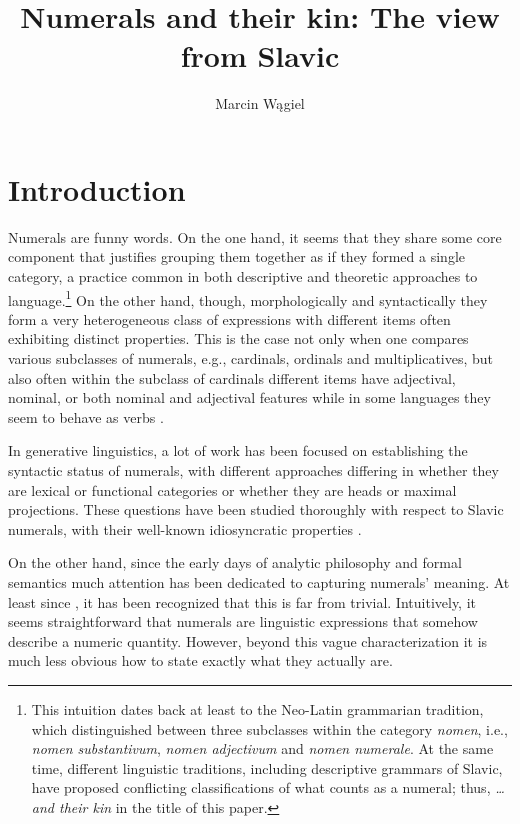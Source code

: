 \documentclass[output=paper]{langscibook}
\author{Marcin Wągiel\affiliation{Masaryk University in Brno, University of Wrocław, Leibniz-ZAS in Berlin}}
\title{Numerals and their kin: The view from Slavic}
\begin{document}
	\maketitle
	
	\section{Introduction}	Numerals are funny words. On the one hand, it seems that they share some core component that justifies grouping them together as if they formed a single category, a practice common in both descriptive and theoretic approaches to language.\footnote{This intuition dates back at least to the Neo-Latin grammarian tradition, which distinguished between three subclasses within the category \textit{nomen}, i.e., \textit{nomen substantivum}, \textit{nomen adjectivum} and \textit{nomen numerale}. At the same time, different linguistic traditions, including descriptive grammars of Slavic, have proposed conflicting classifications of what counts as a numeral; thus, \textit{\dots and their kin} in the title of this paper.}  
 On the other hand, though, morphologically and syntactically they form a very heterogeneous class of expressions with different items often exhibiting distinct properties. This is the case not only when one compares various subclasses of numerals, e.g., cardinals, ordinals and multiplicatives, but also often within the subclass of cardinals different items have adjectival, nominal, or both nominal and adjectival features while in some languages they seem to behave as verbs \citep{donohue2005numerals,ionin_matushansky2018cardinals}.
 
	In generative linguistics, a lot of work has been focused on establishing the syntactic status of numerals, with different approaches differing in whether they are lexical or functional categories or whether they are heads or maximal projections. These questions have been studied thoroughly with respect to Slavic numerals, with their well-known idiosyncratic properties \citep[e.g.,][]{pesetsky1982paths,babby1987case,franks1994parametric,rutkowski2002syntax,klockmann2012polish}. 

	On the other hand, since the early days of analytic philosophy and formal semantics much attention has been dedicated to capturing numerals' meaning. At least since \citet{frege1884grundlagen}, it has been recognized that this is far from trivial. Intuitively, it seems straightforward that numerals are linguistic expressions that somehow describe a numeric quantity. However, beyond this vague characterization it is much less obvious how to state exactly what they actually are. 
	
\end{document}

